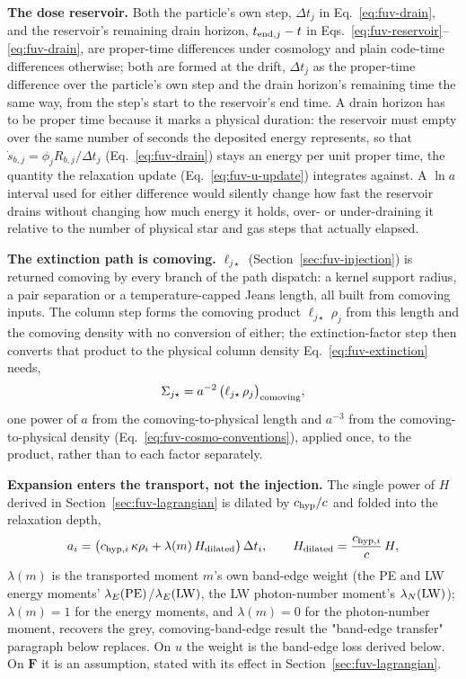 \textbf{The dose reservoir.} Both the particle's own step, $\Delta t_j$
in Eq.~\ref{eq:fuv-drain}, and the reservoir's remaining drain horizon,
$t_{{\rm end},j}-t$ in Eqs.~\ref{eq:fuv-reservoir}--\ref{eq:fuv-drain},
are proper-time differences under cosmology and plain code-time
differences otherwise; both are formed at the drift, $\Delta t_j$ as the
proper-time difference over the particle's own step and the
drain horizon's remaining time the same way, from the step's start to
the reservoir's end time. A drain horizon has to be proper time
because it marks a physical duration: the reservoir must empty over the
same number of seconds the deposited energy represents, so that
$\dot s_{b,j} = \phi_j R_{b,j}/\Delta t_j$ (Eq.~\ref{eq:fuv-drain}) stays
an energy per unit proper time, the quantity the relaxation update
(Eq.~\ref{eq:fuv-u-update}) integrates against. A $\ln a$ interval used
for either difference would silently change how fast the reservoir
drains without changing how much energy it holds, over- or
under-draining it relative to the number of physical star and gas steps
that actually elapsed.

\textbf{The extinction path is comoving.} $\ell_{j\star}$
(Section~\ref{sec:fuv-injection}) is returned comoving by every branch
of the path dispatch: a kernel support
radius, a pair separation or a temperature-capped Jeans length, all
built from comoving inputs.
The column step forms
the comoving product $\ell_{j\star}\,\rho_j$ from this length and the
comoving density with no conversion of either;
the extinction-factor step then converts
that product to the physical column density Eq.~\ref{eq:fuv-extinction}
needs,
\begin{equation}
  \Sigma_{j\star} = a^{-2}\,\big(\ell_{j\star}\,\rho_j\big)_{\rm comoving} ,
  \label{eq:fuv-cosmo-extinction}
\end{equation}
one power of $a$ from the comoving-to-physical length and $a^{-3}$ from
the comoving-to-physical density
(Eq.~\ref{eq:fuv-cosmo-conventions}), applied once, to the product,
rather than to each factor separately.

\textbf{Expansion enters the transport, not the injection.} The single
power of $H$ derived in Section~\ref{sec:fuv-lagrangian} is dilated by
$c_{\rm hyp}/c$ and folded into the relaxation depth,
\begin{equation}
  a_i = \big(c_{{\rm hyp},i}\,\kappa\rho_i
        + \lambda(m)\,H_{\rm dilated}\big)\,\Delta t_i ,
  \qquad H_{\rm dilated} = \frac{c_{{\rm hyp},i}}{c}\,H ,
  \label{eq:fuv-cosmo-relax-depth}
\end{equation}
$\lambda(m)$ is the transported moment $m$'s own band-edge weight
(the PE and LW energy moments' $\lambda_E({\rm PE})$/$\lambda_E({\rm LW})$,
the LW photon-number moment's $\lambda_N({\rm LW})$); $\lambda(m) = 1$
for the energy moments, and $\lambda(m) = 0$ for the photon-number moment,
recovers the grey, comoving-band-edge result the "band-edge transfer"
paragraph below replaces. On $u$ the weight is the band-edge loss derived
below. On $\mathbf F$ it is an assumption, stated with its effect in
Section~\ref{sec:fuv-lagrangian}.

